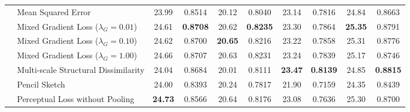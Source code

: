 \begin{table*}[tbh]
\begin{tabular}{ll cc cc cc cc}
                                           & Mean Squared Error                        & 23.99                                    & 0.8514                               & 20.12                                     & 0.8040                                        & 23.14          & 0.7816          & 24.84          & 0.8663          \\
                                           & Mixed Gradient Loss ($\lambda_G = 0.01$)  & 24.61                                    & \textbf{0.8708}                      & 20.62                                     & \textbf{0.8235}                               & 23.30          & 0.7864          & \textbf{25.35} & 0.8791          \\
                                           & Mixed Gradient Loss ($\lambda_G = 0.10$)  & 24.62                                    & 0.8700                               & \textbf{20.65}                            & 0.8216                                        & 23.22          & 0.7858          & 25.31          & 0.8776          \\
                                           & Mixed Gradient Loss ($\lambda_G = 1.00$)  & 24.66                                    & 0.8707                               & 20.63                                     & 0.8231                                        & 23.24          & 0.7839          & 25.17          & 0.8746          \\
                                           & Multi-scale Structural Dissimilarity      & 24.04                                    & 0.8684                               & 20.01                                     & 0.8111                                        & \textbf{23.47} & \textbf{0.8139} & 24.85          & \textbf{0.8815} \\
                                           & Pencil Sketch                             & 24.00                                    & 0.8393                               & 20.24                                     & 0.7817                                        & 21.90          & 0.7159          & 24.35          & 0.8439          \\
                                           & Perceptual Loss without Pooling           & \textbf{24.73}                           & 0.8566                               & 20.64                                     & 0.8176                                        & 23.08          & 0.7636          & 25.30          & 0.8700          \\

\end{tabular}
\end{table*}
